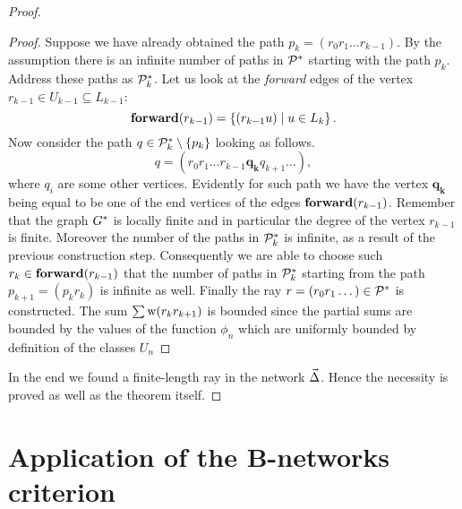 \documentclass[12pt]{amsart}
\begin{document}
\begin{proof}
\begin{proof}
        Suppose we have already obtained the path $p_k= (r_0 r_1\dots r_{k-1})$.
        By the assumption there is an infinite number of paths in $\cal{P}^*$ starting with the path $p_k$.
        Address these paths as $\cal{P}^*_k$.
        Let us look at the \emph{forward} edges of the vertex $r_{k-1} \in U_{k-1} \subseteq L_{k-1}$:
        \[
          \efor(r_{k-1})=\left\{(r_{k-1} u) \mid u \in L_k\right\}.
        \]
        Now consider the path $q \in \cal{P}^*_k \setminus \left\{p_k\right\}$ looking as follows.
        \[
          q=(r_0 r_1 \dots r_{k-1} \mathbf{q_k} q_{k+1} \dots),
        \]
          where $q_i$ are some other vertices.
        Evidently for such path we have the vertex $\mathbf{q_k}$ being equal to be one of the end vertices of the edges $\efor(r_{k-1})$.
        Remember that the graph $\gstar$ is locally finite and in particular the degree of the vertex $r_{k-1}$ is finite.
        Moreover the number of the paths in $\cal{P}^*_k$ is infinite, as a result of the previous construction step.
        Consequently we are able to choose such $r_k \in \efor(r_{k-1})$ that the number of paths in $\cal{P}^*_k$ starting from
          the path $p_{k+1}= (p_k r_k)$ is infinite as well.
        Finally the ray $r = (r_0 r_1 \dots) \in \cal{P}^*$ is constructed.
        The sum $\sum \wtp(r_k r_{k+1})$ is bounded since the partial sums are bounded by the values of the function $\phi_n$
         which are uniformly bounded by definition of the classes $U_n$
      \end{proof}
      In the end we found a finite-length ray in the network $\onet$.
      Hence the necessity is proved as well as the theorem itself.
    \end{proof}

  \section{Application of the B-networks criterion}
\end{document}
